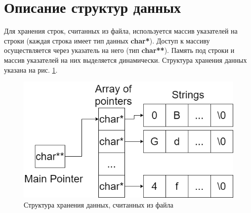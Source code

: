 \section*{Описание структур данных}

Для хранения строк, считанных из файла, используется массив указателей на строки (каждая строка имеет тип данных \textbf{char*}). Доступ к массиву осуществляется через указатель на него (тип \textbf{char**}). Память под строки и массив указателей на них выделяется динамически. Структура хранения данных указана на рис. \ref{data_schema}.

\begin{figure}[H]
	\centering
 	\includegraphics[width=0.6\linewidth]{photo/data_schema}
 	\caption{Структура хранения данных, считанных из файла}
 	\label{data_schema}
\end{figure}